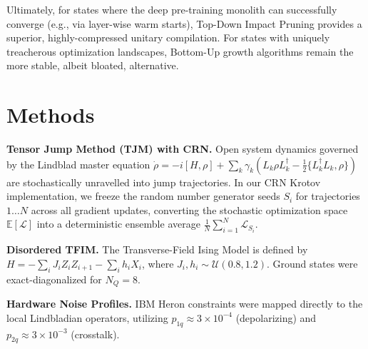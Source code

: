 \documentclass[aps,prl,twocolumn,superscriptaddress,notitlepage]{revtex4-2}
\begin{document}
Ultimately, for states where the deep pre-training monolith can successfully converge (e.g., via layer-wise warm starts), Top-Down Impact Pruning provides a superior, highly-compressed unitary compilation. For states with uniquely treacherous optimization landscapes, Bottom-Up growth algorithms remain the more stable, albeit bloated, alternative.

\section{Methods}
\textbf{Tensor Jump Method (TJM) with CRN.} Open system dynamics governed by the Lindblad master equation $\dot{\rho} = -i[H, \rho] + \sum_k \gamma_k (L_k \rho L_k^\dagger - \frac{1}{2}\{L_k^\dagger L_k, \rho\})$ are stochastically unravelled into jump trajectories. In our CRN Krotov implementation, we freeze the random number generator seeds $S_i$ for trajectories $1 \dots N$ across all gradient updates, converting the stochastic optimization space $\mathbb{E}[\mathcal{L}]$ into a deterministic ensemble average $\frac{1}{N} \sum_{i=1}^N \mathcal{L}_{S_i}$.

\textbf{Disordered TFIM.} The Transverse-Field Ising Model is defined by $H = -\sum_i J_i Z_i Z_{i+1} - \sum_i h_i X_i$, where $J_i, h_i \sim \mathcal{U}(0.8, 1.2)$. Ground states were exact-diagonalized for $N_Q = 8$.

\textbf{Hardware Noise Profiles.} IBM Heron constraints were mapped directly to the local Lindbladian operators, utilizing $p_{1q} \approx 3 \times 10^{-4}$ (depolarizing) and $p_{2q} \approx 3 \times 10^{-3}$ (crosstalk).


\end{document}
